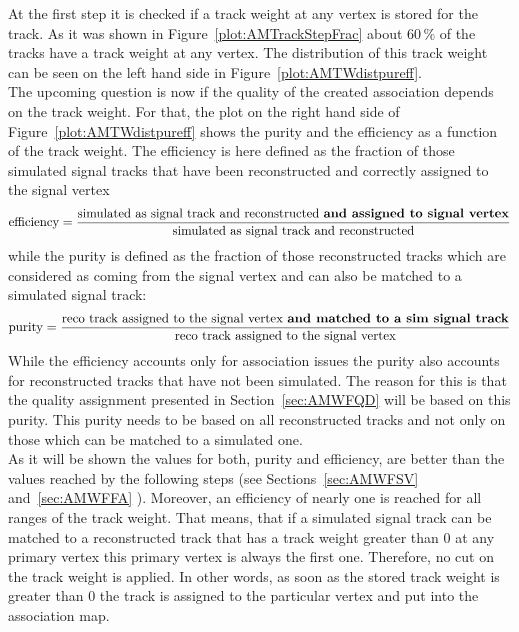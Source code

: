 At the first step it is checked if a track weight at any vertex is stored for the track.  As it was shown in Figure~\ref{plot:AMTrackStepFrac} about $60\,\%$ of the tracks have a track weight at any vertex. The distribution of this track weight can be seen on the left hand side in Figure~\ref{plot:AMTWdistpureff}. \\
The upcoming question is now if the quality of the created association depends on the track weight. For that, the plot on the right hand side of Figure~\ref{plot:AMTWdistpureff} shows the purity and the efficiency as a function of the track weight. The efficiency is here defined as the fraction of those simulated signal tracks that have been reconstructed and correctly assigned to the signal vertex
\begin{equation}
\textrm{efficiency} = \frac{\textrm{simulated as signal track and reconstructed \textbf{and assigned to signal vertex}}}{\textrm{simulated as signal track and reconstructed}}
\label{eq:Efficiency}
\end{equation}
while the purity is defined as the fraction of those reconstructed tracks which are considered as coming from the signal vertex and can also be matched to a simulated signal track:
\begin{equation}
\textrm{purity} = \frac{\textrm{reco track assigned to the signal vertex \textbf{and matched to a sim signal track}}}{\textrm{reco track assigned to the signal vertex}}
\label{eq:Purity}
\end{equation}
While the efficiency accounts only for association issues the purity also accounts for reconstructed tracks that have not been simulated. The reason for this is that the quality assignment presented in Section~\ref{sec:AMWFQD} will be based on this purity. This purity needs to be based on all reconstructed tracks and not only on those which can be matched to a simulated one. \\
As it will be shown the values for both, purity and efficiency, are better than the values reached by the following steps (see Sections~\ref{sec:AMWFSV} and~\ref{sec:AMWFFA} ). Moreover, an efficiency of nearly one is reached for all ranges of the track weight. That means, that if a simulated signal track can be matched to a reconstructed track that has a track weight greater than 0 at any primary vertex this primary vertex is always the first one. Therefore, no cut on the track weight is applied. In other words, as soon as the stored track weight is greater than 0 the track is assigned to the particular vertex and put into the association map.

